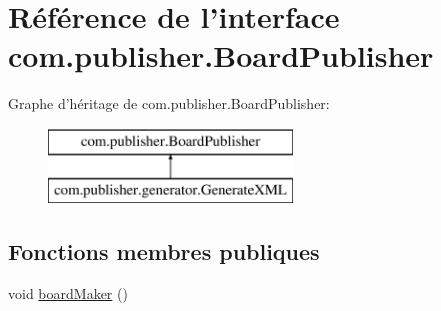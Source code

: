\hypertarget{interfacecom_1_1publisher_1_1BoardPublisher}{\section{Référence de l'interface com.\-publisher.\-Board\-Publisher}
\label{interfacecom_1_1publisher_1_1BoardPublisher}
}
Graphe d'héritage de com.\-publisher.\-Board\-Publisher\-:\begin{figure}[H]
\begin{center}
\leavevmode
\includegraphics[height=2.000000cm]{db/dd9/interfacecom_1_1publisher_1_1BoardPublisher}
\end{center}
\end{figure}
\subsection*{Fonctions membres publiques}
\begin{DoxyCompactItemize}
\item 
void \hyperlink{interfacecom_1_1publisher_1_1BoardPublisher_a608aad61bbb4187737a5a6352d6e4454}{board\-Maker} ()
\end{DoxyCompactItemize}
